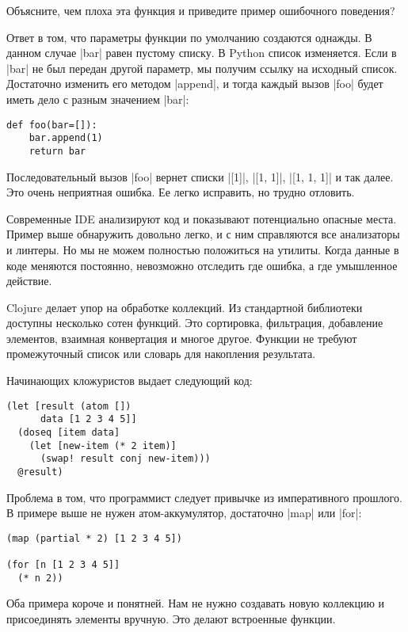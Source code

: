 Объясните, чем плоха эта функция и приведите пример ошибочного поведения?

Ответ в том, что параметры функции по умолчанию создаются однажды. В данном
случае \spverb|bar| равен пустому списку. В Python список изменяется. Если в \spverb|bar| не
был передан другой параметр, мы получим ссылку на исходный список. Достаточно
изменить его методом \spverb|append|, и тогда каждый вызов \spverb|foo| будет иметь дело с
разным значением \spverb|bar|:

\begin{verbatim}
def foo(bar=[]):
    bar.append(1)
    return bar
\end{verbatim}

Последовательный вызов \spverb|foo| вернет списки \spverb|[1]|, \spverb|[1, 1]|, \spverb|[1, 1, 1]| и так
далее. Это очень неприятная ошибка. Ее легко исправить, но трудно отловить.

Современные IDE анализируют код и показывают потенциально опасные места. Пример
выше обнаружить довольно легко, и с ним справляются все анализаторы и
линтеры. Но мы не можем полностью положиться на утилиты. Когда данные в коде
меняются постоянно, невозможно отследить где ошибка, а где умышленное действие.

Clojure делает упор на обработке коллекций. Из стандартной библиотеки доступны
несколько сотен функций. Это сортировка, фильтрация, добавление элементов,
взаимная конвертация и многое другое. Функции не требуют промежуточный список
или словарь для накопления результата.

Начинающих кложуристов выдает следующий код:

\begin{verbatim}
(let [result (atom [])
      data [1 2 3 4 5]]
  (doseq [item data]
    (let [new-item (* 2 item)]
      (swap! result conj new-item)))
  @result)
\end{verbatim}

Проблема в том, что программист следует привычке из императивного прошлого. В
примере выше не нужен атом-аккумулятор, достаточно \spverb|map| или \spverb|for|:

\begin{verbatim}
(map (partial * 2) [1 2 3 4 5])

(for [n [1 2 3 4 5]]
  (* n 2))
\end{verbatim}

Оба примера короче и понятней. Нам не нужно создавать новую коллекцию и
присоединять элементы вручную. Это делают встроенные функции.

